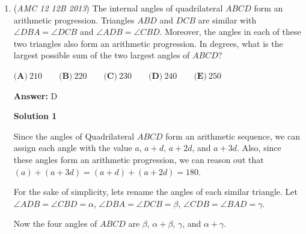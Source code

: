 \begin{enumerate}
 \textbf{Alcumus Solution (Directly Copied from Alcumus)} Solution:The presence of cities $C$ and $E$ is irrelevant to the problem, because upon entering either city, there is only one road going out. Therefore, we can remove those cities, and instead note that there are two roads connecting $A$ and $D,$ two roads connecting $B$ and $D,$ and one road connecting $A$ and $B.$ We can assume that the order in which each pair of roads is traversed does not matter, and then multiply by $2 \cdot 2 =4$ at the end.

 Now, take cases on whether $B$ or $D$ is visited first:Suppose $D$ is visited first. If the other road back to $A$ is then taken, then the only possibility is to travel to $B$ and then travel the two roads between $B$ and $D$ in either order. If, instead, one of the roads to $B$ is taken, then either $A, D, B$ must be visited in that order, or $D, A, B$ must be visited in that order. This gives $3$ possible routes in total.Suppose $B$ is visited first. Then $D, A, D, B$ must be visited in that order, so there is only one possible route.Putting the two cases together and multiplying by $4$ gives the answer, $4(1+3) = \boxed{16}.$



	\item (\textit{AMC 12 12B 2013}) The internal angles of quadrilateral $ABCD$ form an arithmetic progression. Triangles $ABD$ and $DCB$ are similar with $\angle DBA = \angle DCB$ and $\angle ADB = \angle CBD$. Moreover, the angles in each of these two triangles also form an arithmetic progression. In degrees, what is the largest possible sum of the two largest angles of $ABCD$?


 $\textbf{(A)}\ 210 \qquad \textbf{(B)}\ 220 \qquad \textbf{(C)}\ 230 \qquad \textbf{(D)}\ 240 \qquad \textbf{(E)}\ 250$

 \textbf{Answer: }D



\textbf{Solution 1}

Since the angles of Quadrilateral $ABCD$ form an arithmetic sequence, we can assign each angle with the value $a$, $a+d$, $a+2d$, and $a+3d$. Also, since these angles form an arithmetic progression, we can reason out that $(a)+(a+3d)=(a+d)+(a+2d)=180$.

 For the sake of simplicity, lets rename the angles of each similar triangle. Let $\angle ADB = \angle CBD = \alpha$, $\angle DBA = \angle DCB = \beta$, $\angle CDB = \angle BAD = \gamma$.

 Now the four angles of $ABCD$ are $\beta$, $\alpha + \beta$, $\gamma$, and $\alpha + \gamma$.


\end{enumerate}
